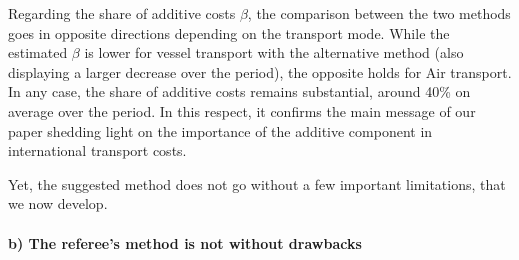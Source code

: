 \documentclass[a4paper,11pt]{article}
\begin{document}
Regarding the share of additive costs $\beta$, the comparison between the two methods goes in opposite directions depending on the transport mode. While the estimated $\beta$ is lower for vessel transport with the alternative method (also displaying a larger decrease over the period), the opposite holds for Air transport. In any case, the share of additive costs remains substantial, around 40\% on average over the period. In this respect, it confirms the main message of our paper shedding light on the importance of the additive component in international transport costs.

Yet, the suggested method does not go without a few important limitations, that we now develop.


\paragraph{b) The referee's method is not without drawbacks}
\end{document}
